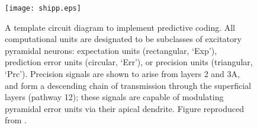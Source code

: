 \begin{figure}

	\texttt{[image: shipp.eps]}
	\caption{A template circuit diagram to implement predictive coding. All computational units are designated to be subclasses of excitatory pyramidal neurons: expectation units (rectangular, ‘Exp’), prediction error units (circular, ‘Err’), or precision units (triangular, ‘Prc’). Precision signals are shown to arise from layers 2 and 3A, and form a descending chain of transmission through the superficial layers (pathway 12); these signals are capable of modulating pyramidal error units via their apical dendrite. Figure reproduced from \cite{Shipp2016}.}
	\label{\figlabel}

\end{figure}